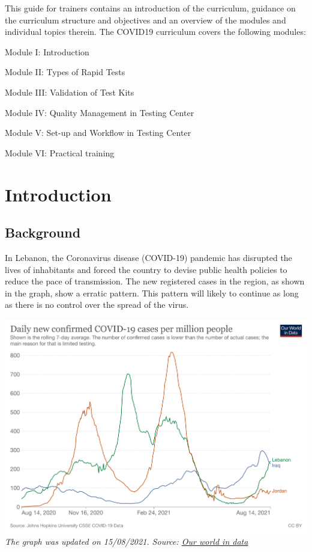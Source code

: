 \documentclass[
]{book}
\begin{document}
This guide for trainers contains an introduction of the curriculum,
guidance on the curriculum structure and objectives and an overview of
the modules and individual topics therein. The COVID19 curriculum covers
the following modules:

Module I: Introduction

Module II: Types of Rapid Tests

Module III: Validation of Test Kits

Module IV: Quality Management in Testing Center

Module V: Set-up and Workflow in Testing Center

Module VI: Practical training

\hypertarget{intro}{%
\chapter{Introduction}\label{intro}}

\hypertarget{background}{%
\section{Background}\label{background}}

In Lebanon, the Coronavirus disease (COVID-19) pandemic has disrupted
the lives of inhabitants and forced the country to devise public health
policies to reduce the pace of transmission. The new registered cases in the region, as shown in the graph, show a erratic pattern. This pattern will likely to continue as long as there is no control over the spread of the virus.

\includegraphics{images/covid19_ME_210814.png}
\emph{The graph was updated on 15/08/2021. Source: \href{https://ourworldindata.org/coronavirus}{Our world in data} }
\end{document}
